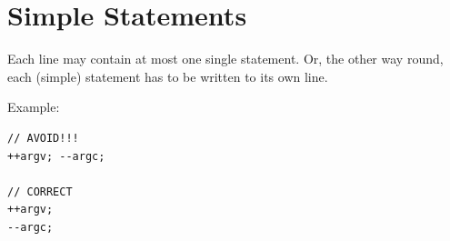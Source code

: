 \section{Simple Statements}
Each line may contain at most one single statement. Or, the other way round, each (simple) statement has to be written to its own line.

Example:
\begin{lstlisting}
// AVOID!!!
++argv; --argc;

// CORRECT
++argv;
--argc;
\end{lstlisting}

